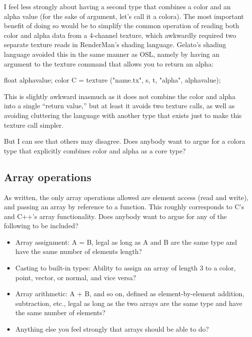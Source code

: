 \documentclass[11pt,letterpaper]{book}
\def\color{{\cf color}\xspace}
\def\normal{{\cf normal}\xspace}
\def\point{{\cf point}\xspace}
\def\vector{{\cf vector}\xspace}
\begin{document}
\begin{annotate}
I feel less strongly about having a second type that combines a
\color and an alpha value (for the sake of argument, let's call it
a {\cf colora}).  The most important benefit of doing so
would be to simplify the common operation of reading both color and
alpha data from a 4-channel texture, which awkwardly required two
separate texture reads in RenderMan's shading language.  Gelato's
shading language avoided this in the same manner as OSL, namely by
having an argument to the texture command that allows you to return
an alpha:

\begin{code}
   float alphavalue;
   color C = texture ("name.tx", s, t, "alpha", alphavalue);
\end{code}

\noindent This is slightly awkward inasmuch as it does not combine
the color and alpha into a single ``return value,'' but at least it
avoids two texture calls, as well as avoiding cluttering the language
with another type that exists just to make this texture call simpler.

But I can see that others may disagree.  Does anybody want to argue
for a {\cf colora} type that explicitly combines color and alpha as a
core type?


\subsection{Array operations}

As written, the only array operations allowed are element access (read
and write), and passing an array by reference to a function.  This
roughly corresponds to C's and C++'s array functionality.  Does
anybody want to argue for any of the following to be included?

\begin{itemize}
\item Array assignment: {\cf A = B}, legal as long as {\cf A} and {\cf
  B} are the same type and have the same number of elements length?
\item Casting to built-in types: Ability to assign an array of length 3
  to a \color, \point, \vector, or \normal, and vice versa?  
\item Array arithmetic: {\cf A + B}, and so on, defined as
  element-by-element addition, subtraction, etc., legal as long as the
  two arrays are the same type and have the same number of elements?
\item Anything else you feel strongly that arrays should be able to do?
\end{itemize}



\end{annotate}
\end{document}
